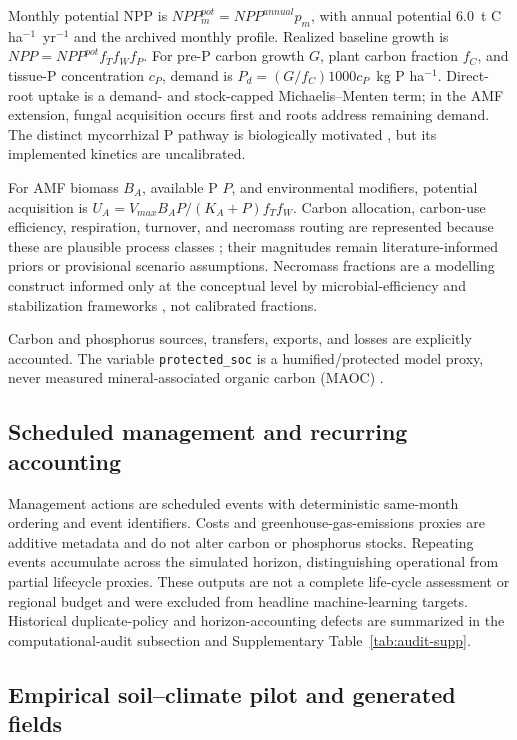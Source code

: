 \documentclass[11pt]{article}
\newcommand{\protectedSOC}{\texttt{protected\_soc}}
\newcommand{\unitC}{t C ha$^{-1}$}
\newcommand{\unitP}{kg P ha$^{-1}$}
\begin{document}
Monthly potential NPP is $NPP_m^{pot}=NPP^{annual}p_m$, with annual potential 6.0~\unitC{}~yr$^{-1}$ and the archived monthly profile. Realized baseline growth is $NPP=NPP^{pot}f_Tf_Wf_P$. For pre-P carbon growth $G$, plant carbon fraction $f_C$, and tissue-P concentration $c_P$, demand is $P_d=(G/f_C)1000c_P$~\unitP. Direct-root uptake is a demand- and stock-capped Michaelis--Menten term; in the AMF extension, fungal acquisition occurs first and roots address remaining demand. The distinct mycorrhizal P pathway is biologically motivated \citep{smith2011roles}, but its implemented kinetics are uncalibrated.

For AMF biomass $B_A$, available P $P$, and environmental modifiers, potential acquisition is $U_A=V_{max}B_AP/(K_A+P)f_Tf_W$. Carbon allocation, carbon-use efficiency, respiration, turnover, and necromass routing are represented because these are plausible process classes \citep{godbold2006mycorrhizal,frey2019mycorrhizal,hawkins2023mycorrhizal}; their magnitudes remain literature-informed priors or provisional scenario assumptions. Necromass fractions are a modelling construct informed only at the conceptual level by microbial-efficiency and stabilization frameworks \citep{cotrufo2013mems,cotrufo2015formation}, not calibrated fractions.

Carbon and phosphorus sources, transfers, exports, and losses are explicitly accounted. The variable \protectedSOC{} is a humified/protected model proxy, never measured mineral-associated organic carbon (MAOC) \citep{lavallee2020conceptualizing}.

\subsection{Scheduled management and recurring accounting}

Management actions are scheduled events with deterministic same-month ordering and event identifiers. Costs and greenhouse-gas-emissions proxies are additive metadata and do not alter carbon or phosphorus stocks. Repeating events accumulate across the simulated horizon, distinguishing operational from partial lifecycle proxies. These outputs are not a complete life-cycle assessment or regional budget and were excluded from headline machine-learning targets. Historical duplicate-policy and horizon-accounting defects are summarized in the computational-audit subsection and Supplementary Table~\ref{tab:audit-supp}.

\subsection{Empirical soil--climate pilot and generated fields}
\end{document}
